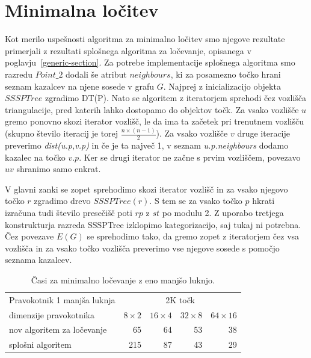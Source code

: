 \documentclass[a4paper, 12pt]{book}
\newcommand{\U}{\texttt{\_}}
\begin{document}
\section{Minimalna ločitev}
Kot merilo uspešnosti algoritma za minimalno ločitev smo njegove rezultate primerjali z rezultati splošnega algoritma za ločevanje, opisanega v poglavju~\ref{generic-section}. Za potrebe implementacije splošnega algoritma smo razredu $Point\U 2$ dodali še atribut $neighbours$, ki za posamezno točko hrani seznam kazalcev na njene sosede v grafu $G$. Najprej z inicializacijo objekta $SSSPTree$ zgradimo DT(P). Nato se algoritem z iteratorjem sprehodi čez vozlišča triangulacije, pred katerih lahko dostopamo do objektov točk. Za vsako vozlišče $u$ gremo ponovno skozi iterator vozlišč, le da ima ta začetek pri trenutnem vozlišču (skupno število iteracij je torej $\frac{n\times (n-1)}{2}$). Za vsako vozlišče $v$ druge iteracije preverimo \textit{dist(u.p,v.p)} in če je ta največ 1, v seznam \textit{u.p.neighbours} dodamo kazalec na točko $v.p$. Ker se drugi iterator ne začne s prvim vozliščem, povezavo $uv$ shranimo samo enkrat.

V glavni zanki se zopet sprehodimo skozi iterator vozlišč in za vsako njegovo točko $r$ zgradimo drevo $SSSPTree(r)$. S tem se za vsako točko $p$ hkrati izračuna tudi število presečišč poti $rp$ z $st$ po modulu 2. Z uporabo tretjega konstrukturja razreda SSSPTree izklopimo kategorizacijo, saj tukaj ni potrebna. Čez povezave $E(G)$ se sprehodimo tako, da gremo zopet z iteratorjem čez vsa vozlišča in za vsako točko vozlišča preverimo vse njegove sosede s pomočjo seznama kazalcev.  
\begin{table}[h!]
\begin{center}
\begin{tabular}{l*{4}{r}}
Pravokotnik 1 manjša luknja & \multicolumn{4}{c}{2K točk}\\
dimenzije pravokotnika	&	$8\times 2$	&	$16\times 4$	&	$32\times 8$ & $64\times 16$ \\	
\hline
nov algoritem za ločevanje	&	65	&	64	&	53	&	38  \\
splošni algoritem			&	215	&	87	&	43	&	29
\end{tabular}
\caption{Časi za minimalno ločevanje z eno manjšo luknjo.}
\label{table6}
\end{center}
\end{table}
\end{document}

